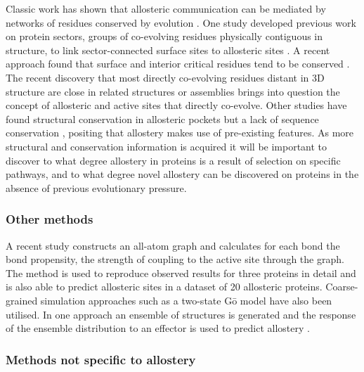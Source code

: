 Classic work has shown that allosteric communication can be mediated by networks of residues conserved by evolution \cite{Lockless1999, Suel2003}.
One study developed previous work on protein sectors, groups of co-evolving residues physically contiguous in structure, to link sector-connected surface sites to allosteric sites \cite{Reynolds2011}.
A recent approach found that surface and interior critical residues tend to be conserved \cite{Clarke2016}.
The recent discovery that most directly co-evolving residues distant in 3D structure are close in related structures or assemblies \cite{Anishchenko2017} brings into question the concept of allosteric and active sites that directly co-evolve.
Other studies have found structural conservation in allosteric pockets but a lack of sequence conservation \cite{Panjkovich2010, Panjkovich2013}, positing that allostery makes use of pre-existing features.
As more structural and conservation information is acquired it will be important to discover to what degree allostery in proteins is a result of selection on specific pathways, and to what degree novel allostery can be discovered on proteins in the absence of previous evolutionary pressure.


\subsubsection{Other methods}

A recent study \cite{Amor2016} constructs an all-atom graph and calculates for each bond the bond propensity, the strength of coupling to the active site through the graph.
The method is used to reproduce observed results for three proteins in detail and is also able to predict allosteric sites in a dataset of 20 allosteric proteins.
Coarse-grained simulation approaches such as a two-state G\={o} model have also been utilised.
In one approach an ensemble of structures is generated and the response of the ensemble distribution to an effector is used to predict allostery \cite{Qi2012}.


\subsubsection{Methods not specific to allostery}

